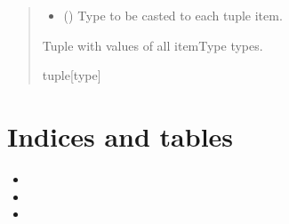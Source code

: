 \documentclass[letterpaper,10pt,english]{sphinxmanual}
\begin{document}
\begin{fulllineitems}
\begin{fulllineitems}
\begin{quote}
\begin{description}
\begin{itemize}
\item {} 
\sphinxAtStartPar
{} () \textendash{} Type to be casted to each tuple item.

\end{itemize}

\sphinxAtStartPar
Tuple with values of all itemType types.

\sphinxAtStartPar
tuple{[}type{]}

\end{description}\end{quote}

\end{fulllineitems}


\end{fulllineitems}



\chapter{Indices and tables}
\label{\detokenize{index:indices-and-tables}}\begin{itemize}
\item {} 
\sphinxAtStartPar
{}

\item {} 
\sphinxAtStartPar
{}

\item {} 
\sphinxAtStartPar
{}

\end{itemize}
\end{document}
